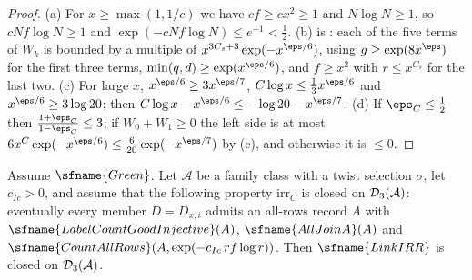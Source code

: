 \begin{proof}
(a) For $x\ge\max(1,1/c)$ we have $cf\ge cx^2\ge1$ and $N\log N\ge1$, so $cNf\log N\ge1$ and
$\exp(-cNf\log N)\le e^{-1}<\frac12$. (b) is :
each of the five terms of $W_k$ is bounded by a multiple of $x^{3C_s+3}\exp(-x^{\eps/6})$, using $g\ge\exp(8x^\eps)$
for the first three terms, $\min(q,d)\ge\exp(x^{\eps/6})$, and $f\ge x^2$ with $r\le x^{C_s}$ for the last two.
(c) For large $x$, $x^{\eps/6}\ge3x^{\eps/7}$, $C\log x\le\frac13x^{\eps/6}$ and $x^{\eps/6}\ge3\log20$; then
$C\log x-x^{\eps/6}\le-\log20-x^{\eps/7}$. (d) If $\eps_C\le\frac12$ then $\frac{1+\eps_C}{1-\eps_C}\le3$; if
$W_0+W_1\ge0$ the left side is at most $6x^C\exp(-x^{\eps/6})\le\frac6{20}\exp(-x^{\eps/7})$ by (c), and otherwise it
is $\le0$.
\end{proof}

\begin{theorem}\label{pf:top-shape:irrthm}
Assume $\sfname{Green}$. Let $\mathcal A$ be a family class with a twist selection $\sigma$, let $c_{Ic}>0$, and
assume that the following property $\mathrm{irr}_C$ is closed on $\mathcal{D}_3(\mathcal A)$: eventually every member
$D=D_{x,i}$ admits an all-rows record $A$ with $\sfname{LabelCountGoodInjective}(A)$, $\sfname{AllJoinA}(A)$ and
$\sfname{CountAllRows}(A,\exp(-c_{Ic}\,rf\log r))$. Then $\sfname{LinkIRR}$ is closed on $\mathcal{D}_3(\mathcal A)$.
\end{theorem}

